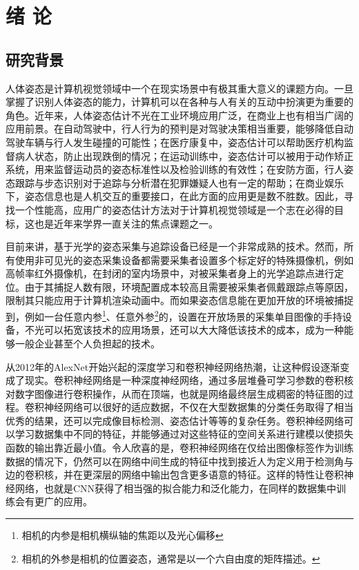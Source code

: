 \chapter{绪 论}
\label{cha:intro}


\section{研究背景}
\label{sec:generalbackground}
人体姿态是计算机视觉领域中一个在现实场景中有极其重大意义的课题方向。一旦掌握了识别人体姿态的能力，计算机可以在各种与人有关的互动中扮演更为重要的角色。近年来，人体姿态估计不光在工业环境应用广泛，在商业上也有相当广阔的应用前景。在自动驾驶中，行人行为的预判是对驾驶决策相当重要，能够降低自动驾驶车辆与行人发生碰撞的可能性；在医疗康复中，姿态估计可以帮助医疗机构监督病人状态，防止出现跌倒的情况；在运动训练中，姿态估计可以被用于动作矫正系统，用来监督运动员的姿态标准性以及检验训练的有效性；在安防方面，行人姿态跟踪与步态识别对于追踪与分析潜在犯罪嫌疑人也有一定的帮助；在商业娱乐下，姿态信息也是人机交互的重要接口，在此方面的应用更是数不胜数。因此，寻找一个性能高，应用广的姿态估计方法对于计算机视觉领域是一个志在必得的目标，这也是近年来学界一直关注的焦点课题之一。

目前来讲，基于光学的姿态采集与追踪设备已经是一个非常成熟的技术。然而，所有使用非可见光的姿态采集设备都需要采集者设置多个标定好的特殊摄像机，例如高帧率红外摄像机，在封闭的室内场景中，对被采集者身上的光学追踪点进行定位。由于其捕捉人数有限，环境配置成本较高且需要被采集者佩戴跟踪点等原因，限制其只能应用于计算机渲染动画中。而如果姿态信息能在更加开放的环境被捕捉到，例如一台任意内参\footnote{相机的内参是相机横纵轴的焦距以及光心偏移}、任意外参\footnote{相机的外参是相机的位置姿态，通常是以一个六自由度的矩阵描述。}的，设置在开放场景的采集单目图像的手持设备，不光可以拓宽该技术的应用场景，还可以大大降低该技术的成本，成为一种能够一般企业甚至个人负担起的技术。

从2012年的AlexNet\cite{alex2012alexnet}开始兴起的深度学习和卷积神经网络热潮，让这种假设逐渐变成了现实。卷积神经网络是一种深度神经网络，通过多层堆叠可学习参数的卷积核对数字图像进行卷积操作，从而在顶端，也就是网络最终层生成稠密的特征图的过程。卷积神经网络可以很好的适应数据，不仅在大型数据集的分类任务取得了相当优秀的结果，还可以完成像目标检测、姿态估计等等的复杂任务。卷积神经网络可以学习数据集中不同的特征，并能够通过对这些特征的空间关系进行建模以使损失函数的输出靠近最小值。令人欣喜的是，卷积神经网络在仅给出图像标签作为训练数据的情况下，仍然可以在网络中间生成的特征中找到接近人为定义用于检测角与边的卷积核，并在更深层的网络中输出包含更多语意的特征\cite{yosinski2015understanding}。这样的特性让卷积神经网络，也就是CNN获得了相当强的拟合能力和泛化能力，在同样的数据集中训练会有更广的应用。

